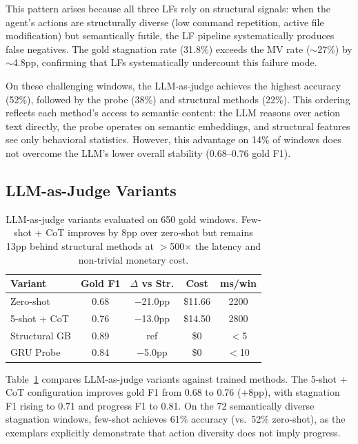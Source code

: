 \documentclass[11pt,a4paper]{article}
\begin{document}
This pattern arises because all three LFs rely on structural signals: when the agent's actions are structurally diverse (low command repetition, active file modification) but semantically futile, the LF pipeline systematically produces false negatives.
The gold stagnation rate (31.8\%) exceeds the MV rate ($\sim$27\%) by $\sim$4.8pp, confirming that LFs systematically undercount this failure mode.

On these challenging windows, the LLM-as-judge achieves the highest accuracy (52\%), followed by the probe (38\%) and structural methods (22\%).
This ordering reflects each method's access to semantic content: the LLM reasons over action text directly, the probe operates on semantic embeddings, and structural features see only behavioral statistics.
However, this advantage on 14\% of windows does not overcome the LLM's lower overall stability (0.68--0.76 gold F1).

\subsection{LLM-as-Judge Variants}
\label{sec:llm-judge}

\begin{table}[t]
\centering
\small
\begin{tabular}{lcccc}
\toprule
\textbf{Variant} & \textbf{Gold F1} & \textbf{$\Delta$ vs Str.} & \textbf{Cost} & \textbf{ms/win} \\
\midrule
Zero-shot & 0.68 & $-$21.0pp & \$11.66 & 2200 \\
5-shot + CoT & 0.76 & $-$13.0pp & \$14.50 & 2800 \\
\midrule
Structural GB & 0.89 & ref & \$0 & $<$5 \\
GRU Probe & 0.84 & $-$5.0pp & \$0 & $<$10 \\
\bottomrule
\end{tabular}
\caption{LLM-as-judge variants evaluated on 650 gold windows. Few-shot + CoT improves by 8pp over zero-shot but remains 13pp behind structural methods at $>$500$\times$ the latency and non-trivial monetary cost.}
\label{tab:llm-judge}
\end{table}

Table~\ref{tab:llm-judge} compares LLM-as-judge variants against trained methods.
The 5-shot + CoT configuration improves gold F1 from 0.68 to 0.76 (+8pp), with stagnation F1 rising to 0.71 and progress F1 to 0.81.
On the 72 semantically diverse stagnation windows, few-shot achieves 61\% accuracy (vs.\ 52\% zero-shot), as the exemplars explicitly demonstrate that action diversity does not imply progress.
\end{document}
